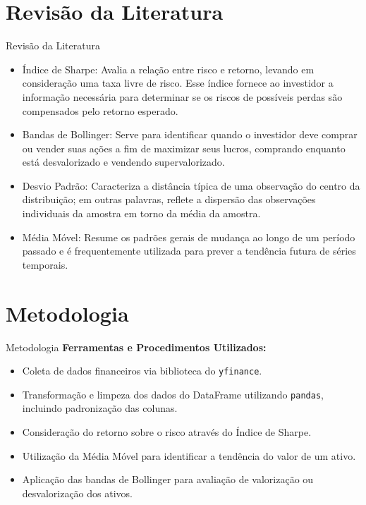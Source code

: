 \documentclass[aspectratio=169]{beamer}
\begin{document}
\section{Revisão da Literatura}
\begin{frame}{Revisão da Literatura}
  \begin{itemize}
    \item Índice de Sharpe: Avalia a relação entre risco e retorno, levando em consideração uma taxa livre de risco. Esse índice fornece ao investidor a informação necessária para determinar se os riscos de possíveis perdas são compensados pelo retorno esperado. \cite{de2015fundos}

    \item Bandas de Bollinger: Serve para identificar quando o investidor deve comprar ou vender suas ações a fim de maximizar seus lucros, comprando enquanto está desvalorizado e vendendo supervalorizado. \cite{yan2023enhanced}

    \item Desvio Padrão: Caracteriza a distância típica de uma observação do centro da distribuição; em outras palavras, reflete a dispersão das observações individuais da amostra em torno da média da amostra. \cite{curran1998fundamental}

    \item Média Móvel: Resume os padrões gerais de mudança ao longo de um período passado e é frequentemente utilizada para prever a tendência futura de séries temporais. \cite{su2022self}

  \end{itemize}
\end{frame}

\section{Metodologia}
\begin{frame}{Metodologia}
  \textbf{Ferramentas e Procedimentos Utilizados:}
  \begin{itemize}
    \item Coleta de dados financeiros via biblioteca do \texttt{yfinance}.
    \item Transformação e limpeza dos dados do DataFrame utilizando \texttt{pandas}, incluindo padronização das colunas.
    \item Consideração do retorno sobre o risco através do Índice de Sharpe.
    \item Utilização da Média Móvel para identificar a tendência do valor de um ativo.
    \item Aplicação das bandas de Bollinger para avaliação de valorização ou desvalorização dos ativos.
  \end{itemize}
\end{frame}
\end{document}
